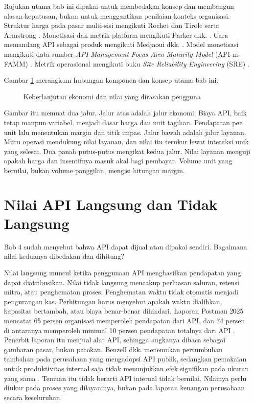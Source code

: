 Rujukan utama bab ini dipakai untuk membedakan konsep dan membangun alasan keputusan, bukan untuk menggantikan penilaian
konteks organisasi. Struktur harga pada pasar multi-sisi mengikuti Rochet dan Tirole \cite{rochet2003platform, c12-rochet2006}
serta Armstrong \cite{armstrong2006competition}. Monetisasi dan metrik platform mengikuti Parker dkk. \cite{parker2016platform}.
Cara memandang API sebagai produk mengikuti Medjaoui dkk. \cite{medjaoui2021continuous}. Model monetisasi mengikuti data
sumber \textit{API Management Focus Area Maturity Model} (API-m-FAMM) \cite{mathijssen2020}. Metrik operasional mengikuti
buku \textit{Site Reliability Engineering} (SRE) \cite{c12-sre-monitoring}.

Gambar \ref{fig:ch12-ilustrasi-bab} merangkum hubungan komponen dan konsep utama bab ini.
\begin{figure}[!htb]
  \centering
  
  \caption{Keberlanjutan ekonomi dan nilai yang dirasakan pengguna}
  \label{fig:ch12-ilustrasi-bab}
\end{figure}

Gambar itu memuat dua jalur. Jalur atas adalah jalur ekonomi. Biaya API, baik tetap maupun variabel, menjadi dasar harga dan
unit tagihan. Pendapatan per unit lalu menentukan margin dan titik impas. Jalur bawah adalah jalur layanan. Mutu operasi
mendukung nilai layanan, dan nilai itu terukur lewat interaksi unik yang selesai. Dua panah putus-putus mengikat kedua jalur.
Nilai layanan menguji apakah harga dan insentifnya masuk akal bagi pembayar. Volume unit yang bernilai, bukan volume panggilan,
mengisi hitungan margin.

\section{Nilai API Langsung dan Tidak Langsung}

Bab 4 sudah menyebut bahwa API dapat dijual atau dipakai sendiri. Bagaimana nilai keduanya dibedakan dan dihitung?

Nilai langsung muncul ketika penggunaan API menghasilkan pendapatan yang dapat diatribusikan. Nilai tidak langsung mencakup
perluasan saluran, retensi mitra, atau penghematan proses. Penghematan waktu tidak otomatis menjadi pengurangan kas.
Perhitungan harus menyebut apakah waktu dialihkan, kapasitas bertambah, atau biaya benar-benar dihindari. Laporan Postman 2025
mencatat 65 persen organisasi memperoleh pendapatan dari API, dan 74 persen di antaranya memperoleh minimal 10 persen
pendapatan totalnya dari API \cite{postman2025}. Penerbit laporan itu menjual alat API, sehingga angkanya dibaca sebagai
gambaran pasar, bukan patokan. Benzell dkk. menemukan pertumbuhan tambahan pada perusahaan yang mengadopsi API publik, sedangkan
pemakaian untuk produktivitas internal saja tidak menunjukkan efek signifikan pada ukuran yang sama \cite{benzell2024apis}.
Temuan itu tidak berarti API internal tidak bernilai. Nilainya perlu diukur pada proses yang dilayaninya, bukan pada laporan
keuangan perusahaan secara keseluruhan.

